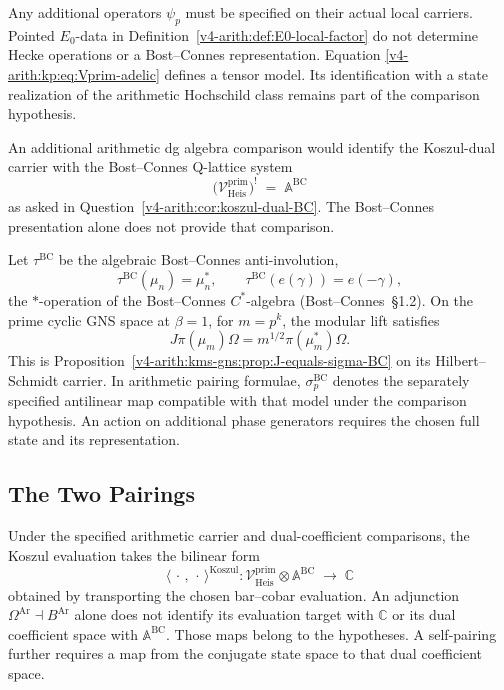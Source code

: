 Any additional operators \(\psi_p\) must be specified on their
actual local carriers. Pointed \(E_0\)-data in
Definition~\ref{v4-arith:def:E0-local-factor} do not determine
Hecke operations or a Bost--Connes representation. Equation
\eqref{v4-arith:kp:eq:Vprim-adelic} defines a tensor model.
Its identification with a state realization of the arithmetic
Hochschild class remains part of the comparison hypothesis.

An additional arithmetic dg algebra comparison would identify the
Koszul-dual carrier with the Bost--Connes Q-lattice system
\begin{equation}
\bigl(\mathcal{V}^{\mathrm{prim}}_{\mathrm{Heis}}\bigr)^{!}
\;=\;\mathbb{A}^{\mathrm{BC}}
\end{equation}
as asked in Question~\ref{v4-arith:cor:koszul-dual-BC}.
The Bost--Connes presentation alone does not provide that comparison.

Let \(\tau^{\mathrm{BC}}\) be the algebraic
Bost--Connes anti-involution,
\[
\tau^{\mathrm{BC}}(\mu_{n})=\mu_{n}^{*},\qquad
\tau^{\mathrm{BC}}(e(\gamma))=e(-\gamma),
\]
the \(*\)-operation of the Bost--Connes \(C^{*}\)-algebra
(Bost--Connes~\S1.2). On the prime cyclic GNS space at \(\beta=1\),
for \(m=p^k\), the modular lift satisfies
\[
 J\pi(\mu_m)\Omega=m^{1/2}\pi(\mu_m^*)\Omega.
\]
This is Proposition~\ref{v4-arith:kms-gns:prop:J-equals-sigma-BC}
on its Hilbert--Schmidt carrier. In arithmetic pairing formulae,
\(\sigma_p^{\mathrm{BC}}\) denotes the separately specified
antilinear map compatible with that model under the comparison
hypothesis. An action on additional phase generators requires the
chosen full state and its representation.

\subsection{The Two Pairings}
\label{v4-arith:kp:two-pairings}

Under the specified arithmetic carrier and dual-coefficient
comparisons, the Koszul evaluation takes the bilinear form
\begin{equation}
\label{v4-arith:kp:eq:Koszul-pairing-def}
\langle\,\cdot\,,\,\cdot\,\rangle^{\mathrm{Koszul}}\colon
\mathcal{V}^{\mathrm{prim}}_{\mathrm{Heis}}\otimes\mathbb{A}^{\mathrm{BC}}\;\longrightarrow\;\mathbb{C}
\end{equation}
obtained by transporting the chosen bar--cobar evaluation.
An adjunction \(\Omega^{\mathrm{Ar}}\dashv B^{\mathrm{Ar}}\)
alone does not identify its evaluation target with \(\mathbb C\)
or its dual coefficient space with \(\mathbb A^{\mathrm{BC}}\).
Those maps belong to the hypotheses. A self-pairing further requires
a map from the conjugate state space to that dual coefficient space.

